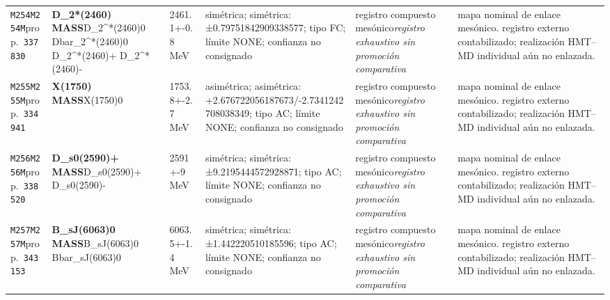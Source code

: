 \begin{landscape}
\begin{longtable}{L{1.85cm}L{4.45cm}L{2.35cm}L{4.05cm}L{3.35cm}L{7.15cm}}
\texttt{M254}\newline \texttt{M254M}\newline prop.\ \texttt{337830} & \textbf{D\_\allowbreak{}2*(2460) MASS}\newline D\_\allowbreak{}2\textasciicircum{}*(2460)0 \textbar{}\allowbreak{} Dbar\_\allowbreak{}2\textasciicircum{}*(2460)0 \textbar{}\allowbreak{} D\_\allowbreak{}2\textasciicircum{}*(2460)+ \textbar{}\allowbreak{} D\_\allowbreak{}2\textasciicircum{}*(2460)- & 2461.1+-0.8\,MeV & simétrica; simétrica: ±0.79751842909338577; tipo FC; límite NONE; confianza no consignado & registro compuesto mesónico\newline \emph{registro exhaustivo sin promoción comparativa} & mapa nominal de enlace mesónico. registro externo contabilizado; realización HMT--MD individual aún no enlazada. \\
\texttt{M255}\newline \texttt{M255M}\newline prop.\ \texttt{334941} & \textbf{X(1750) MASS}\newline X(1750)0 & 1753.8+-2.7\,MeV & asimétrica; asimétrica: +2.676722056187673/-2.7341242708038349; tipo AC; límite NONE; confianza no consignado & registro compuesto mesónico\newline \emph{registro exhaustivo sin promoción comparativa} & mapa nominal de enlace mesónico. registro externo contabilizado; realización HMT--MD individual aún no enlazada. \\
\texttt{M256}\newline \texttt{M256M}\newline prop.\ \texttt{338520} & \textbf{D\_\allowbreak{}s0(2590)+ MASS}\newline D\_\allowbreak{}s0(2590)+ \textbar{}\allowbreak{} D\_\allowbreak{}s0(2590)- & 2591+-9\,MeV & simétrica; simétrica: ±9.2195444572928871; tipo AC; límite NONE; confianza no consignado & registro compuesto mesónico\newline \emph{registro exhaustivo sin promoción comparativa} & mapa nominal de enlace mesónico. registro externo contabilizado; realización HMT--MD individual aún no enlazada. \\
\texttt{M257}\newline \texttt{M257M}\newline prop.\ \texttt{343153} & \textbf{B\_\allowbreak{}sJ(6063)0 MASS}\newline B\_\allowbreak{}sJ(6063)0 \textbar{}\allowbreak{} Bbar\_\allowbreak{}sJ(6063)0 & 6063.5+-1.4\,MeV & simétrica; simétrica: ±1.442220510185596; tipo AC; límite NONE; confianza no consignado & registro compuesto mesónico\newline \emph{registro exhaustivo sin promoción comparativa} & mapa nominal de enlace mesónico. registro externo contabilizado; realización HMT--MD individual aún no enlazada. \\

\end{longtable}
\end{landscape}
